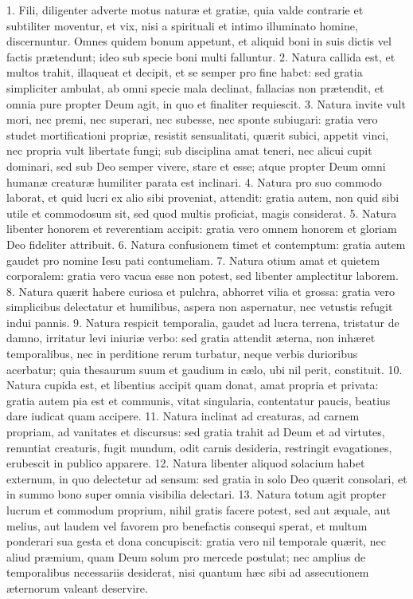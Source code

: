 \documentclass[twoside]{article}
\begin{document}
1. Fili, diligenter adverte motus naturæ et gratiæ, quia valde contrarie et subtiliter moventur, et vix, nisi a spirituali et intimo illuminato homine, discernuntur. Omnes quidem bonum appetunt, et aliquid boni in suis dictis vel factis prætendunt; ideo sub specie boni multi falluntur.
2. Natura callida est, et multos trahit, illaqueat et decipit, et se semper pro fine habet: sed gratia simpliciter ambulat, ab omni specie mala declinat, fallacias non prætendit, et omnia pure propter Deum agit, in quo et finaliter requiescit.
3. Natura invite vult mori, nec premi, nec superari, nec subesse, nec sponte subiugari: gratia vero studet mortificationi propriæ, resistit sensualitati, quærit subici, appetit vinci, nec propria vult libertate fungi; sub disciplina amat teneri, nec alicui cupit dominari, sed sub Deo semper vivere, stare et esse; atque propter Deum omni humanæ creaturæ humiliter parata est inclinari.
4. Natura pro suo commodo laborat, et quid lucri ex alio sibi proveniat, attendit: gratia autem, non quid sibi utile et commodosum sit, sed quod multis proficiat, magis considerat.
5. Natura libenter honorem et reverentiam accipit: gratia vero omnem honorem et gloriam Deo fideliter attribuit.
6. Natura confusionem timet et contemptum: gratia autem gaudet pro nomine Iesu pati contumeliam.
7. Natura otium amat et quietem corporalem: gratia vero vacua esse non potest, sed libenter amplectitur laborem.
8. Natura quærit habere curiosa et pulchra, abhorret vilia et grossa: gratia vero simplicibus delectatur et humilibus, aspera non aspernatur, nec vetustis refugit indui pannis.
9. Natura respicit temporalia, gaudet ad lucra terrena, tristatur de damno, irritatur levi iniuriæ verbo: sed gratia attendit æterna, non inhæret temporalibus, nec in perditione rerum turbatur, neque verbis durioribus acerbatur; quia thesaurum suum et gaudium in cælo, ubi nil perit, constituit.
10. Natura cupida est, et libentius accipit quam donat, amat propria et privata: gratia autem pia est et communis, vitat singularia, contentatur paucis, beatius dare iudicat quam accipere.
11. Natura inclinat ad creaturas, ad carnem propriam, ad vanitates et discursus: sed gratia trahit ad Deum et ad virtutes, renuntiat creaturis, fugit mundum, odit carnis desideria, restringit evagationes, erubescit in publico apparere.
12. Natura libenter aliquod solacium habet externum, in quo delectetur ad sensum: sed gratia in solo Deo quærit consolari, et in summo bono super omnia visibilia delectari.
13. Natura totum agit propter lucrum et commodum proprium, nihil gratis facere potest, sed aut æquale, aut melius, aut laudem vel favorem pro benefactis consequi sperat, et multum ponderari sua gesta et dona concupiscit: gratia vero nil temporale quærit, nec aliud præmium, quam Deum solum pro mercede postulat; nec amplius de temporalibus necessariis desiderat, nisi quantum hæc sibi ad assecutionem æternorum valeant deservire.
\end{document}
